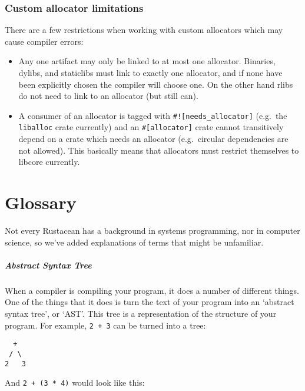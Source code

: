 \documentclass[a4paper,]{book}
\let\oldparagraph\paragraph
\renewcommand{\paragraph}[1]{\oldparagraph{#1}\mbox{}}
\begin{document}
\subsection{Custom allocator
limitations}\label{custom-allocator-limitations}

There are a few restrictions when working with custom allocators which
may cause compiler errors:

\begin{itemize}
\item
  Any one artifact may only be linked to at most one allocator.
  Binaries, dylibs, and staticlibs must link to exactly one allocator,
  and if none have been explicitly chosen the compiler will choose one.
  On the other hand rlibs do not need to link to an allocator (but still
  can).
\item
  A consumer of an allocator is tagged with
  \texttt{\#!{[}needs\_allocator{]}} (e.g.~the \texttt{liballoc} crate
  currently) and an \texttt{\#{[}allocator{]}} crate cannot transitively
  depend on a crate which needs an allocator (e.g.~circular dependencies
  are not allowed). This basically means that allocators must restrict
  themselves to libcore currently.
\end{itemize}

\hypertarget{sec--glossary}{\chapter{Glossary}\label{sec--glossary}}

Not every Rustacean has a background in systems programming, nor in
computer science, so we've added explanations of terms that might be
unfamiliar.

\hypertarget{abstract-syntax-tree}{\paragraph{Abstract Syntax
Tree}\label{abstract-syntax-tree}}

When a compiler is compiling your program, it does a number of different
things. One of the things that it does is turn the text of your program
into an `abstract syntax tree', or `AST'. This tree is a representation
of the structure of your program. For example, \texttt{2\ +\ 3} can be
turned into a tree:

\begin{verbatim}
  +
 / \
2   3
\end{verbatim}

And \texttt{2\ +\ (3\ *\ 4)} would look like this:
\end{document}
